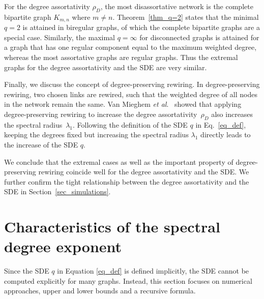 \documentclass{comnet}%
\begin{document}
For the degree assortativity $\rho_D$, the most disassortative network is the complete bipartite graph $K_{m,n}$ where $m \neq n$. Theorem~\ref{thm_q=2} states that the minimal $q=2$ is attained in biregular graphs, of which the complete bipartite graphs are a special case. Similarly, the maximal $q=\infty$ for disconnected graphs is attained for a graph that has one regular component equal to the maximum weighted degree, whereas the most assortative graphs are regular graphs. Thus the extremal graphs for the degree assortativity and the SDE are very similar.

Finally, we discuss the concept of degree-preserving rewiring. In degree-preserving rewiring, two chosen links are rewired, such that the weighted degree of all nodes in the network remain the same. Van Mieghem \emph{et al}.\ \cite{vanmieghem2010degree} showed that applying degree-preserving rewiring to increase the degree assortativity~$\rho_D$ also increases the spectral radius~$\lambda_1$. Following the definition of the SDE $q$ in Eq.~\eqref{eq_def}, keeping the degrees fixed but increasing the spectral radius $\lambda_1$ directly leads to the increase of the SDE $q$. 

We conclude that the extremal cases as well as the important property of degree-preserving rewiring coincide well for the degree assortativity and the SDE. We further confirm the tight relationship between the degree assortativity and the SDE in Section~\ref{sec_simulations}.


\section{Characteristics of the spectral degree exponent}\label{sec_numerics}
Since the SDE $q$ in Equation \eqref{eq_def} is defined implicitly, the SDE cannot be computed explicitly for many graphs. Instead, this section focuses on numerical approaches, upper and lower bounds and a recursive formula.
\end{document}
